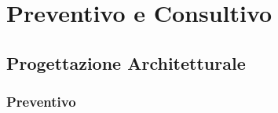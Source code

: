 \section{Preventivo e Consultivo}
\subsection{Progettazione Architetturale}
\begin{frame}
  \frametitle{Preventivo}
  \begin{center}
  	
  \end{center}

\end{frame}
